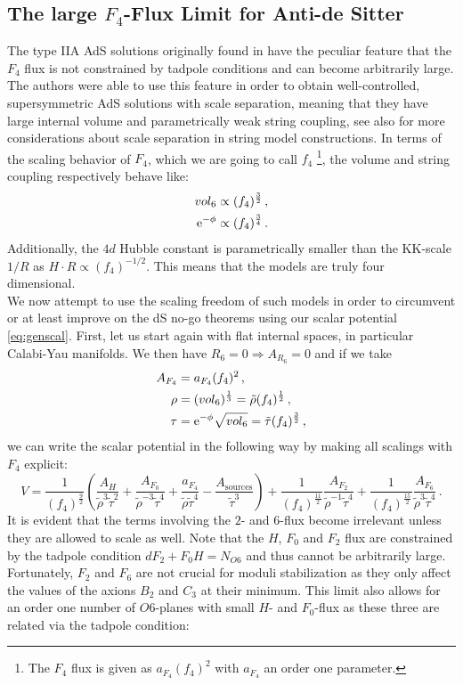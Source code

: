 \documentclass[a4paper,12pt]{report}
\newcommand{\be}{\begin{equation}}
\newcommand{\ee}{\end{equation}}
\newcommand{\bea}{\begin{equation}\begin{aligned}}
\newcommand{\eea}{\end{aligned}\end{equation}}
\def\rme{{\rm e}}
\begin{document}
\subsection{The large $F_4$-Flux Limit for Anti-de Sitter}
The type IIA AdS solutions originally found in \cite{DeWolfe:2005uu} have the peculiar feature that the $F_4$ flux is not constrained by tadpole conditions and can become arbitrarily large. The authors were able to use this feature in order to obtain well-controlled, supersymmetric AdS solutions with scale separation, meaning that they have large internal volume and parametrically weak string coupling, see also \cite{Dasgupta:1999ss,Giddings:2001yu,Balasubramanian:2005zx,Gautason:2015tig,Westphal:2006tn,Farakos:2020phe} for more considerations about scale separation in string model constructions. In terms of the scaling behavior of $F_4$, which we are going to call $f_4$ \footnote{The $F_4$ flux is given as $a_{F_4} (f_4)^ 2$ with $a_{F_4}$ an order one parameter.}, the volume and string coupling respectively behave like:
\bea 
vol_6 &\propto (f_4)^ {\frac{3}{2}}\,,\\
\rme^ {-\phi} &\propto (f_4)^ {\frac{3}{4}}\,.
\eea
Additionally, the $4d$ Hubble constant is parametrically smaller than the KK-scale $1/R$ as $H\cdot R \propto (f_4)^ {-1/2}$. This means that the models are truly four dimensional.\\
We now attempt to use the scaling freedom of such models in order to circumvent or at least improve on the dS no-go theorems using our scalar  potential \eqref{eq:genscal}. First, let us start again with flat internal spaces, in particular Calabi-Yau manifolds. We then have $R_6=0 \Rightarrow A_{R_6} =0$ and if we take 
\bea 
A_{F_4} &= a_{F_4} (f_4)^ 2\,,\\
\rho &= (vol_6)^ {\frac{1}{3}} = \tilde{\rho} (f_4)^ {\frac{1}{2}}\,,\\
\tau &= \rme^ {-\phi} \sqrt{vol_6} = \tilde{\tau} (f_4)^ {\frac{3}{2}}\,,
\eea
we can write the scalar potential in the following way by making all scalings with $F_4$ explicit:
\be 
V = \frac{1}{(f_4)^ {\frac{9}{2}}} \left( \frac{A_H}{\tilde{\rho}^3 \tilde{\tau}^ 2} + \frac{A_{F_0}}{\tilde{\rho}^ {-3}\tilde{\tau}^ 4} + \frac{a_{F_4}}{\tilde{\rho}\tilde{\tau}^ 4} - \frac{A_{\text{sources}}}{\tilde{\tau}^ 3} \right) + \frac{1}{(f_4)^ {\frac{11}{2}}} \frac{A_{F_2}}{\tilde{\rho}^ {-1}\tilde{\tau}^ 4} + \frac{1}{(f_4)^ {\frac{15}{2}}} \frac{A_{F_6}}{\tilde{\rho}^3\tilde{\tau}^ 4}\,.
\ee
It is evident that the terms involving the $2$- and $6$-flux become irrelevant unless they are allowed to scale as well. Note that the $H$, $F_0$ and $F_2$ flux are constrained by the tadpole condition $dF_2 + F_0H = N_{O6}$ and thus cannot be arbitrarily large. Fortunately, $F_2$ and $F_6$ are not crucial for moduli stabilization \cite{DeWolfe:2005uu} as they only affect the values of the axions $B_2$ and $C_3$ at their minimum. This limit also allows for an order one number of $O6$-planes with small $H$- and $F_0$-flux as these three are related via the tadpole condition:
\end{document}
